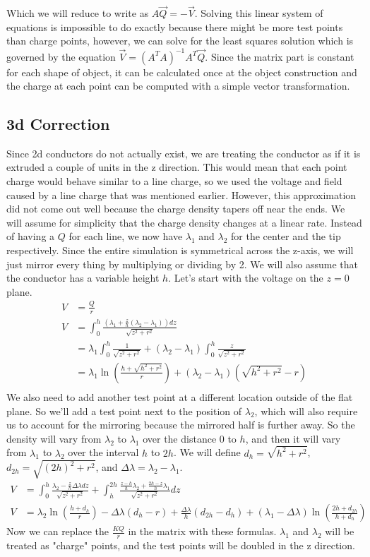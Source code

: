 \documentclass{article}
\begin{document}
Which we will reduce to write as $A\vec{Q} = -\vec{V}$. Solving this linear system of equations is impossible to do exactly because there might be more test points than charge points, however, we can solve for the least squares solution which is governed by the equation $\vec{V} = (A^TA)^{-1}A^T\vec{Q}$. Since the matrix part is constant for each shape of object, it can be calculated once at the object construction and the charge at each point can be computed with a simple vector transformation.
\subsection{3d Correction}
Since 2d conductors do not actually exist, we are treating the conductor as if it is extruded a couple of units in the z direction. This would mean that each point charge would behave similar to a line charge, so we used the voltage and field caused by a line charge that was mentioned earlier. However, this approximation did not come out well because the charge density tapers off near the ends. We will assume for simplicity that the charge density changes at a linear rate. Instead of having a $Q$ for each line, we now have $\lambda_1$ and $\lambda_2$ for the center and the tip respectively. Since the entire simulation is symmetrical across the z-axis, we will just mirror every thing by multiplying or dividing by 2. We will also assume that the conductor has a variable height $h$. Let's start with the voltage on the $z=0$ plane.
\begin{align*}
    V &= \frac{Q}{r}\\
    V &= \int_0^h \frac{(\lambda_1 + \frac{z}{h}(\lambda_2-\lambda_1)) dz}{\sqrt{z^2+r^2}}\\
    &= \lambda_1\int_0^h \frac{1}{\sqrt{z^2+r^2}} + (\lambda_2-\lambda_1)\int_0^h \frac{z}{\sqrt{z^2+r^2}}\\
    &= \lambda_1\ln\left(\frac{h+\sqrt{h^2+r^2}}{r}\right)+(\lambda_2-\lambda_1)(\sqrt{h^2+r^2}-r)\\
\end{align*}
We also need to add another test point at a different location outside of the flat plane. So we'll add a test point next to the position of $\lambda_2$, which will also require us to account for the mirroring because the mirrored half is further away. So the density will vary from $\lambda_2$ to $\lambda_1$ over the distance $0$ to $h$, and then it will vary from $\lambda_1$ to $\lambda_2$ over the interval $h$ to $2h$. We will define $d_h = \sqrt{h^2+r^2}$, $d_{2h} = \sqrt{(2h)^2+r^2}$, and $\Delta\lambda = \lambda_2-\lambda_1$.
\begin{align*}
    V &= \int_0^h \frac{\lambda_2 - \frac{z}{h}\Delta\lambda dz}{\sqrt{z^2+r^2}} + \int_h^{2h} \frac{\frac{z-h}{h}\lambda_2 + \frac{2h-z}{h}\lambda_1}{\sqrt{z^2+r^2}}dz\\
    V &= \lambda_2\ln\left(\frac{h+d_h}{r}\right)-\Delta\lambda(d_h-r)+\frac{\Delta\lambda}{h}(d_{2h}-d_h) + (\lambda_1-\Delta\lambda)\ln\left(\frac{2h+d_{2h}}{h+d_h}\right)
\end{align*}
Now we can replace the $\frac{KQ}{r}$ in the matrix with these formulas. $\lambda_1$ and $\lambda_2$ will be treated as "charge" points, and the test points will be doubled in the z direction.
\end{document}
